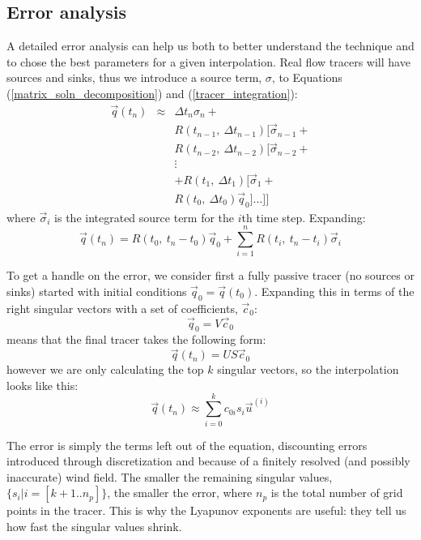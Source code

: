 \documentclass{article}
\begin{document}
\subsection{Error analysis}

A detailed error analysis can help us both to better understand the technique
and to chose the best parameters for a given interpolation.
Real flow tracers will have sources and sinks, thus we introduce a source
term, $\sigma$, to Equations (\ref{matrix_soln_decomposition})
and (\ref{tracer_integration}):
\begin{eqnarray}
	  \vec q(t_n) 
  & \approx & \Delta t_{n} \sigma_{n} + \nonumber \\
  & & R(t_{n-1}, ~ \Delta t_{n-1}) [\vec \sigma_{n-1} + \nonumber \\
  & & R(t_{n-2}, ~ \Delta t_{n-2}) [\vec \sigma_{n-2} + \nonumber \\
  & & \vdots \nonumber \\
  & & + R(t_1, ~ \Delta t_1) [\vec \sigma_1 + \nonumber \\
  & & R(t_0, ~ \Delta t_0) \vec q_0 ]...]]
\end{eqnarray}
where $\vec \sigma_i$ is the integrated source term for the $i$th time step.
Expanding:
\begin{equation}
\vec q(t_n) 
   = R(t_0,~t_n-t_0) \vec q_0 + \sum_{i=1}^{n} R(t_i,~t_n-t_i) \vec \sigma_i
  \label{sources_sinks}
\end{equation}

To get a handle on the error, we consider first a fully passive tracer 
(no sources or sinks) started with initial conditions $\vec q_0=\vec q(t_0)$.
Expanding this in terms of the right singular vectors with a set
of coefficients, $\vec c_0$:
\begin{equation}
	\vec q_0 = V \vec c_0
	\label{c0}
\end{equation}
means that the final tracer takes the following form:
\begin{equation}
	\vec q(t_n) = U S \vec c_0
\end{equation}
however we are only calculating the top $k$ singular vectors, so the
interpolation looks like this:
\begin{equation}
	\vec q(t_n) \approx \sum_{i=0}^k c_{0i} s_i \vec u^{(i)}
\end{equation}

The error is simply the terms left out of the equation,
discounting errors introduced through discretization and because of
a finitely resolved (and possibly inaccurate) wind field.
The smaller the remaining singular values, $\lbrace s_i|i=[k+1..n_p]\rbrace$,
the smaller the error, where $n_p$ is the total number of grid points in the tracer.
This is why the Lyapunov exponents are useful:
they tell us how fast the singular values shrink.
\end{document}
